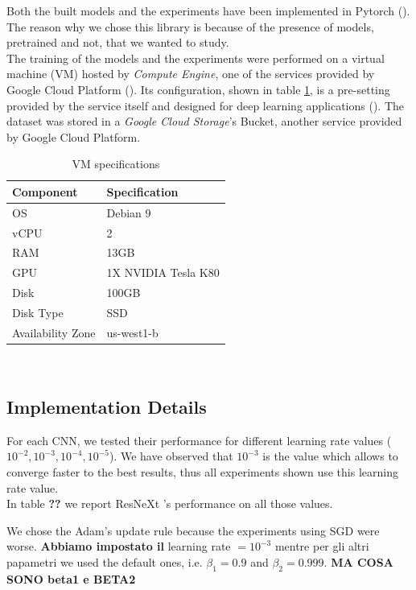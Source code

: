 \documentclass{article}
\begin{document}
Both the built models and the experiments have been implemented in Pytorch (\cite{pytorch}). The reason why we chose this library is because of the presence of models, pretrained and not, that we wanted to study.\\
The training of the models and the experiments were performed on a virtual machine (VM) hosted by \textit{Compute Engine}, one of the services provided by Google Cloud Platform (\cite{gcloud}). Its configuration, shown in table \ref{table:specVM}, is a pre-setting provided by the service itself and designed for deep learning applications  (\cite{vmconfig}). The dataset was stored in a \textit{Google Cloud Storage}'s Bucket, another service provided by Google Cloud Platform.

\begin{table}
	\centering
	\begin{tabular}{|l|l|} 
		\hline
		\textbf{Component} & \textbf{Specification}  \\ 
		\hline
		OS                 & Debian 9                \\
		vCPU               & 2                       \\
		RAM                & 13GB                    \\
		GPU                & 1X NVIDIA Tesla K80     \\
		Disk               & 100GB                   \\
		Disk Type          & SSD                     \\
		Availability Zone  & us-west1-b              \\
		\hline
	\end{tabular}
\\
\caption{VM specifications}
   	\label{table:specVM}
\end{table}

\subsection{Implementation Details}\label{ImplDet}

For each CNN, we tested their performance for different learning rate values ($10^{-2}, 10^{-3}, 10^{-4}, 10^{-5}$). We have observed that $10^{-3}$ is the value which allows to converge faster to the best results, thus all experiments shown use this learning rate value.\\
In table \textbf{??} we report ResNeXt 's performance on all those values.

We chose the Adam's update rule because the experiments using SGD were worse. \textbf{Abbiamo impostato il }learning rate $= 10^{-3}$ mentre per gli altri papametri we used the default ones, i.e. $\beta_{1}  = 0.9$ and $\beta_{2} = 0.999$.  \textbf{MA COSA SONO beta1 e BETA2}\\
\end{document}
